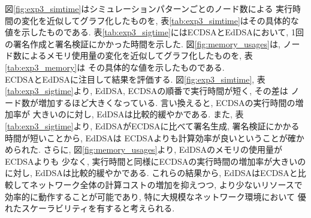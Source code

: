 \indent 図\ref{fig:exp3_simtime}はシミュレーションパターンごとのノード数による
実行時間の変化を近似してグラフ化したものを, 表\ref{tab:exp3_simtime}はその具体的な
値を示したものである. 表\ref{tab:exp3_sigtime}にはECDSAとEdDSAにおいて, 
1回の署名作成と署名検証にかかった時間を示した. 図\ref{fig:memory_usages}は, 
ノード数によるメモリ使用量の変化を近似してグラフ化したものを, 表\ref{tab:exp3_memory}は
その具体的な値を示したものである. \\
\indent ECDSAとEdDSAに注目して結果を評価する. 図\ref{fig:exp3_simtime}, 
表\ref{tab:exp3_sigtime}より, EdDSA, ECDSAの順番で実行時間が短く, その差は
ノード数が増加するほど大きくなっている. 言い換えると, ECDSAの実行時間の増加率が
大きいのに対し, EdDSAは比較的緩やかである. また, 表\ref{tab:exp3_sigtime}より, 
EdDSAがECDSAに比べて署名生成, 署名検証にかかる時間が短いことから, EdDSAは
ECDSAよりも計算効率が良いということが確かめられた. さらに, 
図\ref{fig:memory_usages}より, EdDSAのメモリの使用量がECDSAよりも
少なく, 実行時間と同様にECDSAの実行時間の増加率が大きいのに対し, EdDSAは比較的緩やかである. 
これらの結果から, EdDSAはECDSAと比較してネットワーク全体の計算コストの増加を抑えつつ, 
より少ないリソースで効率的に動作することが可能であり, 特に大規模なネットワーク環境において
優れたスケーラビリティを有すると考えられる. \\


